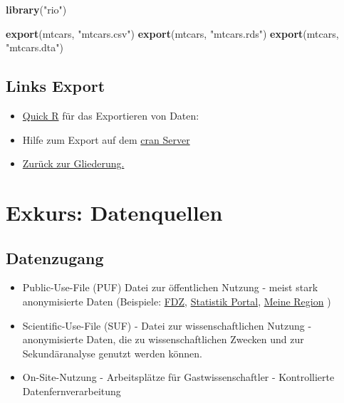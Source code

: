\documentclass[]{article}
\newenvironment{Shaded}{\begin{snugshade}}{\end{snugshade}}
\newcommand{\KeywordTok}[1]{\textcolor[rgb]{0.13,0.29,0.53}{\textbf{{#1}}}}
\newcommand{\StringTok}[1]{\textcolor[rgb]{0.31,0.60,0.02}{{#1}}}
\newcommand{\NormalTok}[1]{{#1}}
\begin{document}
\begin{Shaded}
\begin{Highlighting}[]
\KeywordTok{library}\NormalTok{(}\StringTok{"rio"}\NormalTok{)}

\KeywordTok{export}\NormalTok{(mtcars, }\StringTok{"mtcars.csv"}\NormalTok{)}
\KeywordTok{export}\NormalTok{(mtcars, }\StringTok{"mtcars.rds"}\NormalTok{)}
\KeywordTok{export}\NormalTok{(mtcars, }\StringTok{"mtcars.dta"}\NormalTok{)}
\end{Highlighting}
\end{Shaded}

\subsection{Links Export}\label{links-export}

\begin{itemize}
\item
  \href{http://www.statmethods.net/input/exportingdata.html}{Quick R}
  für das Exportieren von Daten:
\item
  Hilfe zum Export auf dem
  \href{http://cran.r-project.org/doc/manuals/r-release/R-data.pdf}{cran
  Server}
\item
  \href{https://github.com/Japhilko/IntroR/blob/master/2016/README.md}{Zurück
  zur Gliederung.}
\end{itemize}

\section{Exkurs: Datenquellen}\label{exkurs-datenquellen}

\subsection{Datenzugang}\label{datenzugang}

\begin{itemize}
\item
  Public-Use-File (PUF) Datei zur öffentlichen Nutzung - meist stark
  anonymisierte Daten (Beispiele:
  \href{www.forschungsdatenzentrum.de}{FDZ},
  \href{www.statistik-portal.de}{Statistik Portal},
  \href{www.infothek.statistik.rlp.de/lis/MeineRegion/index.asp}{Meine
  Region} )
\item
  Scientific-Use-File (SUF) - Datei zur wissenschaftlichen Nutzung -
  anonymisierte Daten, die zu wissenschaftlichen Zwecken und zur
  Sekundäranalyse genutzt werden können.
\item
  On-Site-Nutzung - Arbeitsplätze für Gastwissenschaftler -
  Kontrollierte Datenfernverarbeitung
\end{itemize}
\end{document}
